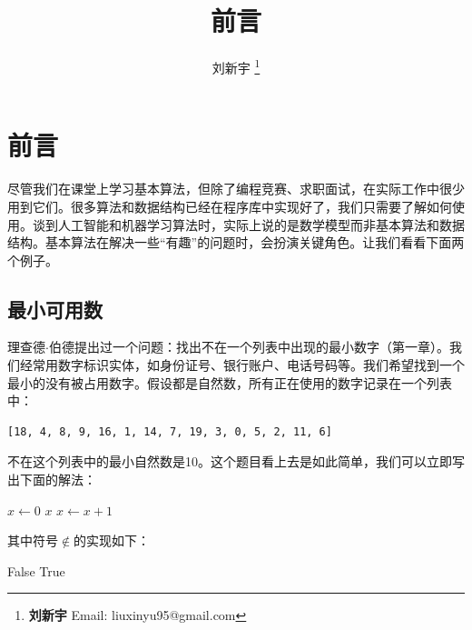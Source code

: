 \documentclass[b5paper]{ctexart}
\begin{document}
\title{前言}

\author{刘新宇
\thanks{{\bfseries 刘新宇} \newline
  Email: liuxinyu95@gmail.com \newline}
  }

\maketitle
\fi


\chapter*{前言}

尽管我们在课堂上学习基本算法，但除了编程竞赛、求职面试，在实际工作中很少用到它们。很多算法和数据结构已经在程序库中实现好了，我们只需要了解如何使用。谈到人工智能和机器学习算法时，实际上说的是数学模型而非基本算法和数据结构。基本算法在解决一些“有趣”的问题时，会扮演关键角色。让我们看看下面两个例子。

\section*{最小可用数}
\label{min-free} 

理查德$\cdot$伯德提出过一个问题：找出不在一个列表中出现的最小数字（\cite{fp-pearls}第一章）。我们经常用数字标识实体，如身份证号、银行账户、电话号码等。我们希望找到一个最小的没有被占用数字。假设都是自然数，所有正在使用的数字记录在一个列表中：

\begin{Verbatim}[fontsize=\footnotesize]
[18, 4, 8, 9, 16, 1, 14, 7, 19, 3, 0, 5, 2, 11, 6]
\end{Verbatim}

不在这个列表中的最小自然数是10。这个题目看上去是如此简单，我们可以立即写出下面的解法：

\begin{algorithmic}[1]
  \State $x \gets 0$
  \Loop
      \State \Return $x$
    \Else
      \State $x \gets x + 1$
    \EndIf
  \EndLoop
\EndFunction
\end{algorithmic}

其中符号$\notin$的实现如下：

\begin{algorithmic}[1]
      \State \Return False
    \EndIf
  \EndFor
  \State \Return True
\EndFunction
\end{algorithmic}
\end{document}
